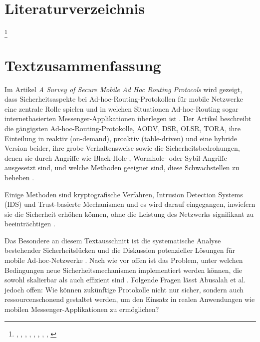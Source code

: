 \chapter{Literaturverzeichnis}
\renewcommand{\bibname}{} %
\begingroup
\let\clearpage\relax %

\nopagebreak

\endgroup

\footnote{\cite{Chatterjee2015}, \cite{Song2004}, \cite{Quadros2011}, \cite{Singh2013}, \cite{Shakir2016}, \cite{Li2012}, \cite{Benhaddou2015}, \cite{Ferrer2023}, \cite{Ali2022}}


\chapter{Textzusammenfassung}\label{ch:intro}

Im Artikel \textit{A Survey of Secure Mobile Ad Hoc Routing Protocols} wird gezeigt, dass Sicherheitsaspekte 
bei Ad-hoc-Routing-Protokollen für mobile Netzwerke eine zentrale Rolle spielen und in welchen Situationen 
Ad-hoc-Routing sogar internetbasierten Messenger-Applikationen überlegen ist \cite[S. 1]{Li2007}.
Der Artikel beschreibt die gängigsten Ad-hoc-Routing-Protokolle, AODV, DSR, OLSR, TORA, ihre Einteilung in reaktiv (on-demand), proaktiv (table-driven)
und eine hybride Version beider, ihre grobe Verhaltensweise \cite[S. 2]{Li2007} sowie die Sicherheitsbedrohungen, 
denen sie durch Angriffe wie Black-Hole-, Wormhole- oder Sybil-Angriffe ausgesetzt sind, und welche Methoden geeignet sind, diese Schwachstellen zu 
beheben \cite[S. 4-11]{Li2007}.

Einige Methoden sind kryptografische Verfahren, Intrusion Detection Systems (IDS) und Trust-basierte Mechanismen und 
es wird darauf eingegangen, inwiefern sie die Sicherheit erhöhen können, ohne die Leistung 
des Netzwerks signifikant zu beeinträchtigen \cite[S. 7]{Li2007}. 

Das Besondere an diesem Textausschnitt ist die systematische Analyse bestehender Sicherheitslücken und die 
Diskussion potenzieller Lösungen für mobile Ad-hoc-Netzwerke \cite[S. 9]{Li2007}. Nach wie vor offen ist das 
Problem, unter welchen Bedingungen neue Sicherheitsmechanismen implementiert werden können, die sowohl skalierbar 
als auch effizient sind \cite[S. 12]{Li2007}. Folgende Fragen lässt Abusalah et al. jedoch offen: Wie können 
zukünftige Protokolle nicht nur sicher, sondern auch ressourcenschonend gestaltet werden, um den Einsatz in realen 
Anwendungen wie mobilen Messenger-Applikationen zu ermöglichen?

